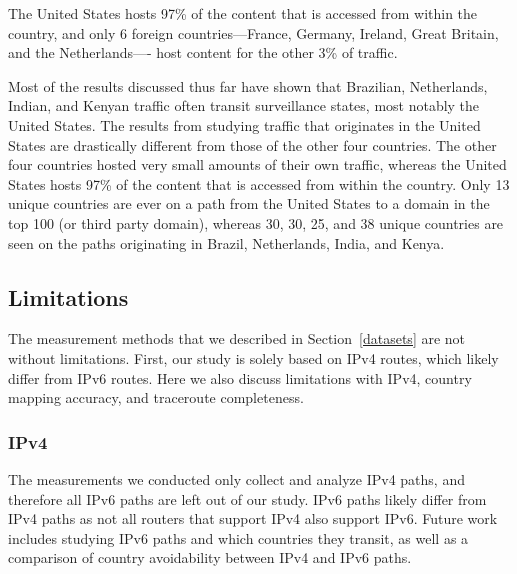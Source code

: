 
\begin{finding}
The United States hosts 97\% of the content that is accessed from within the country, and only 6 foreign countries---France, Germany, Ireland, Great Britain, and the Netherlands---- host content for the other 3\% of traffic.
\end{finding}
Most of the results discussed thus far have shown that Brazilian, Netherlands, Indian, and Kenyan traffic often transit surveillance states, most notably the United States.  The results from studying traffic that originates in the United States are drastically different from those of the other four countries.  The other four countries hosted very small amounts of their own traffic, whereas the United States hosts 97\% of the content that is accessed from within the country.  Only 13 unique countries are ever on a path from the United States to a domain in the top 100 (or third party domain), whereas 30, 30, 25, and 38 unique countries are seen on the paths originating in Brazil, Netherlands, India, and Kenya.  


\subsection{Limitations}
The measurement methods that we described in Section~\ref{datasets} are not without limitations.  First, our study is solely based on IPv4 routes, which likely differ from IPv6 routes.  Here we also discuss limitations with IPv4, country mapping accuracy, and traceroute completeness.

\subsubsection{IPv4}
The measurements we conducted only collect and analyze IPv4 paths, and therefore all IPv6 paths are left out of our study.  IPv6 paths likely differ from IPv4 paths as not all routers that support IPv4 also support IPv6.  Future work includes studying IPv6 paths and which countries they transit, as well as a comparison of country avoidability between IPv4 and IPv6 paths. 


